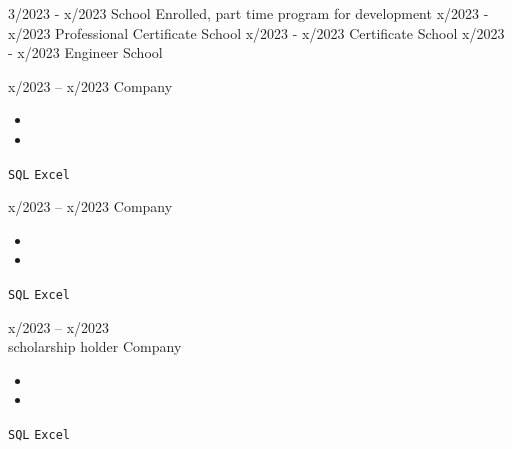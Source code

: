 \documentclass[9pt]{developercv} %
\begin{document}
\vspace{-10 pt}
\begin{entrylist}
    \entry
		{3/2023 - x/2023} %
		{\lipsum[1][1] } %
		{School} %
		{Enrolled, part time program for development} %
    \entry
		{x/2023 - x/2023}
		{Professional Certificate}
		{School}
		{\lipsum[1][1]}
	\entry
		{x/2023 - x/2023}
		{Certificate}
		{School}
		{\lipsum[1][2]}
	\entry
		{x/2023 - x/2023}
		{Engineer}
		{School}
		{\lipsum[1][2]}
\end{entrylist}

\vspace{-10 pt}
\begin{entrylist}
	\entry
        {x/2023 -- x/2023} %
		{\lipsum[1][1]}  %
		{Company}  %
		{\vspace{-10pt}
        \begin{itemize}[noitemsep,topsep=0pt,parsep=0pt,partopsep=0pt, leftmargin=-1pt]
            \item \lipsum[1][1-2] %
            \item \lipsum[1][3-4]
        \end{itemize} 
        \texttt{SQL} \slashsep \texttt{Excel}} %
	\entry
		{x/2023 -- x/2023}
		{\lipsum[1][1]}
		{Company}
		{\vspace{-10pt}
        \begin{itemize}[noitemsep,topsep=0pt,parsep=0pt,partopsep=0pt, leftmargin=-1pt]
            \item \lipsum[1][1-2]
            \item \lipsum[1][3-4]
        \end{itemize} 
        \texttt{SQL} \slashsep \texttt{Excel}}
	\entry
		{x/2023 -- x/2023 \\\footnotesize{scholarship holder}}
		{\lipsum[1][1]}
		{Company}
		{\vspace{-10pt}
        \begin{itemize}[noitemsep,topsep=0pt,parsep=0pt,partopsep=0pt, leftmargin=-1pt]
            \item \lipsum[1][1-2]
            \item \lipsum[1][3-4]
        \end{itemize} 
        \texttt{SQL} \slashsep \texttt{Excel}}
\end{entrylist}
\end{document}
